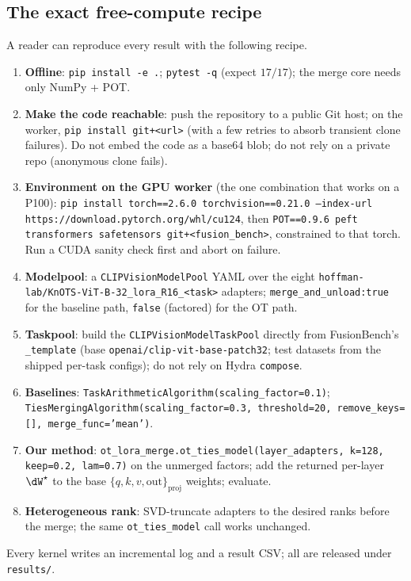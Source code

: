 \subsection{The exact free-compute recipe}
\label{app:recipe}
A reader can reproduce every result with the following recipe.
\begin{enumerate}[leftmargin=1.5em,itemsep=2pt]
\item \textbf{Offline}: \texttt{pip install -e .}; \texttt{pytest -q} (expect $17/17$); the merge core
needs only NumPy + POT.
\item \textbf{Make the code reachable}: push the repository to a public Git host; on the worker,
\texttt{pip install git+<url>} (with a few retries to absorb transient clone failures). Do not embed the
code as a base64 blob; do not rely on a private repo (anonymous clone fails).
\item \textbf{Environment on the GPU worker} (the one combination that works on a P100):
\texttt{pip install torch==2.6.0 torchvision==0.21.0 --index-url
https://download.pytorch.org/whl/cu124}, then \texttt{POT==0.9.6 peft transformers safetensors
git+<fusion\_bench>}, constrained to that torch. Run a CUDA sanity check first and abort on failure.
\item \textbf{Modelpool}: a \texttt{CLIPVisionModelPool} YAML over the eight
\texttt{hoffman-lab/KnOTS-ViT-B-32\_lora\_R16\_<task>} adapters; \texttt{merge\_and\_unload:true} for the
baseline path, \texttt{false} (factored) for the OT path.
\item \textbf{Taskpool}: build the \texttt{CLIPVisionModelTaskPool} directly from FusionBench's
\texttt{\_template} (base \texttt{openai/clip-vit-base-patch32}; test datasets from the shipped per-task
configs); do not rely on Hydra \texttt{compose}.
\item \textbf{Baselines}: \texttt{TaskArithmeticAlgorithm(scaling\_factor=0.1)};
\texttt{TiesMergingAlgorithm(scaling\_factor=0.3, threshold=20, remove\_keys=[], merge\_func='mean')}.
\item \textbf{Our method}: \texttt{ot\_lora\_merge.ot\_ties\_model(layer\_adapters, k=128, keep=0.2,
lam=0.7)} on the unmerged factors; add the returned per-layer $\dW^\star$ to the base
$\{q,k,v,\text{out}\}_{\text{proj}}$ weights; evaluate.
\item \textbf{Heterogeneous rank}: SVD-truncate adapters to the desired ranks before the merge; the same
\texttt{ot\_ties\_model} call works unchanged.
\end{enumerate}
Every kernel writes an incremental log and a result CSV; all are released under \texttt{results/}.

